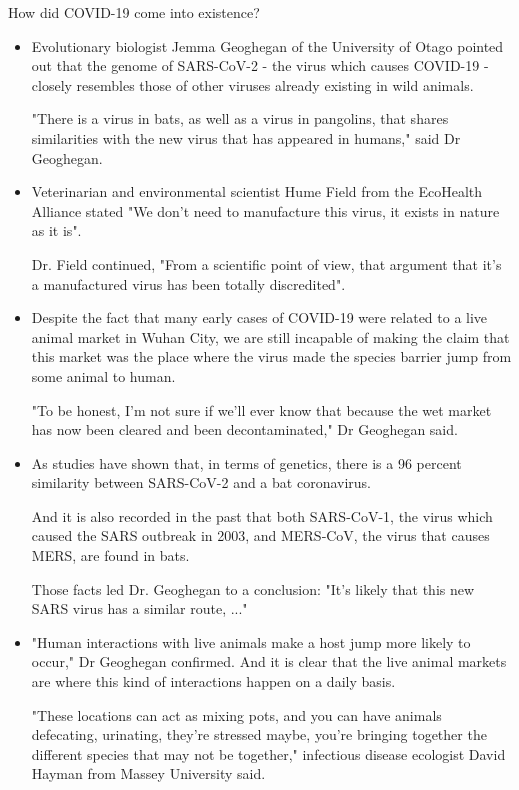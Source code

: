     \par How did COVID-19 come into existence? \parencite{CoronavirusOrigin}
      \begin{itemize}
        \item Evolutionary biologist Jemma Geoghegan of the University of Otago pointed out that the genome of SARS-CoV-2 - the virus which causes COVID-19 - closely resembles those of other viruses already existing in wild animals.
        \par "There is a virus in bats, as well as a virus in pangolins, that shares similarities with the new virus that has appeared in humans," said Dr Geoghegan.
        \item Veterinarian and environmental scientist Hume Field from the EcoHealth Alliance stated "We don't need to manufacture this virus, it exists in nature as it is".
        \par Dr. Field continued, "From a scientific point of view, that argument that it's a manufactured virus has been totally discredited".
        \item Despite the fact that many early cases of COVID-19 were related to a live animal market in Wuhan City, we are still incapable of making the claim that this market was the place where the virus made the species barrier jump from some animal to human.
        \par "To be honest, I'm not sure if we'll ever know that because the wet market has now been cleared and been decontaminated," Dr Geoghegan said.
        \item As studies have shown that, in terms of genetics, there is a 96 percent similarity between SARS-CoV-2 and a bat coronavirus.
        \par And it is also recorded in the past that both SARS-CoV-1, the virus which caused the SARS outbreak in 2003, and MERS‐CoV, the virus that causes MERS, are found in bats.
        \par Those facts led Dr. Geoghegan to a conclusion: "It's likely that this new SARS virus has a similar route, ..."
        \item "Human interactions with live animals make a host jump more likely to occur," Dr Geoghegan confirmed. And it is clear that the live animal markets are where this kind of interactions happen on a daily basis.
        \par "These locations can act as mixing pots, and you can have animals defecating, urinating, they're stressed maybe, you're bringing together the different species that may not be together," infectious disease ecologist David Hayman from Massey University said.

\end{itemize}
